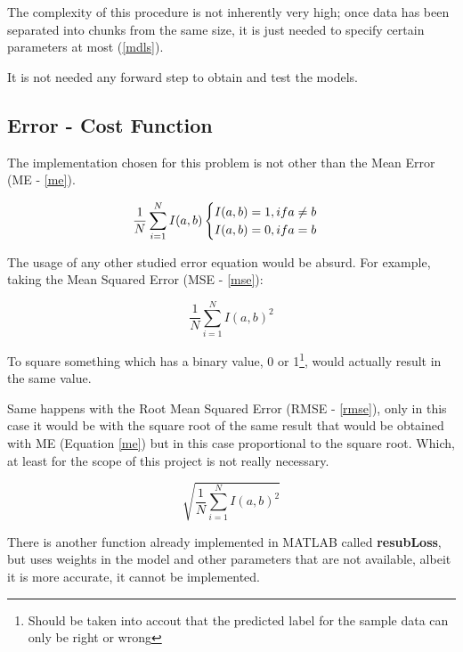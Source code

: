 \documentclass[11pt]{article}
\begin{document}
The complexity of this procedure is not inherently very high; once data has been
separated into chunks from the same size, it is just needed to specify certain
parameters at most (\hyperref[mdls]{\ref{mdls}}).

It is not needed any forward step to obtain and test the models.

\subsection{Error - Cost Function}

The implementation chosen for this problem is not other than the Mean Error
(ME - \hyperref[me]{\ref{me}}).

\begin{equation}
 \centering
 \frac{1}{N} \sum_{i=1}^{N} {I(a, b)} \label{me}

 \begin{cases}
  I(a, b) = 1, if a \neq b\\
  I(a, b) = 0, if a = b
 \end{cases}
\end{equation}

The usage of any other studied error equation would be absurd. For example,
taking the Mean Squared Error (MSE - \hyperref[mse]{\ref{mse}}):

\begin{equation}
 \frac{1}{N} \sum_{i=1}^{N} {I(a, b)^2} \label{mse}
\end{equation}

To square something which has a binary value, 0 or 1\footnote{Should be taken
into accout that the predicted label for the sample data can only be right or
wrong}, would actually result in the same value. 

Same happens with the Root Mean Squared Error (RMSE - 
\hyperref[rmse]{\ref{rmse}}), only in this case it would be with the square root 
of the same result that would be obtained with ME (Equation 
\hyperref[me]{\ref{me}}) but in this case proportional to the square root. 
Which, at least for the scope of this project is not really necessary.

\begin{equation}
 \sqrt{\frac{1}{N} \sum_{i=1}^{N} {I(a, b)^2}} \label{rmse}
\end{equation}

There is another function already implemented in MATLAB called 
\textbf{resubLoss}, but uses weights in the model and other parameters that are
not available, albeit it is more accurate, it cannot be implemented.
\end{document}
